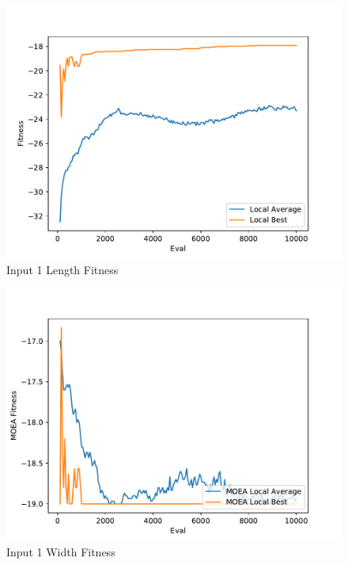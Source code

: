 \documentclass{standalone}
\begin{document}
\begin{figure}[!htb]
	\caption{Input 1 Length Fitness}
	\label{fig:graph_1005}
	\includegraphics[width=\textwidth]{../graphs/graphs/1005.pdf}
\end{figure}


\begin{figure}[!htb]
	\caption{Input 1 Width Fitness}
	\label{fig:graph_1005_moea}
	\includegraphics[width=\textwidth]{../graphs/graphs/1005_moea.pdf}
\end{figure}
\end{document}
